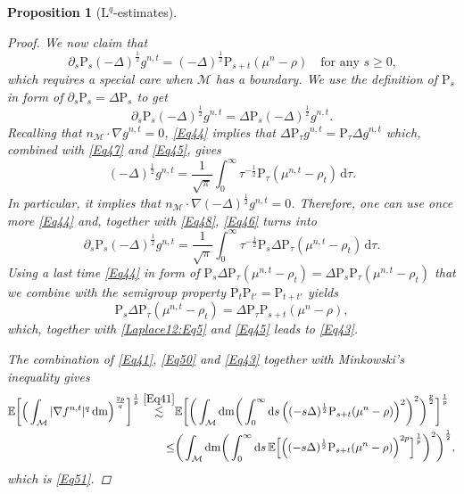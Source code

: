 \documentclass[11pt,a4paper,oneside]{amsart}
\numberwithin{equation}{section}
\newtheorem{proposition}[theorem]{Proposition}
\newcommand{\dd}{\mathrm{d}}
\newcommand{\LL}{\mathrm{L}}
\newcommand{\m}{\mathrm{m}}
\begin{document}
\begin{proposition}[$\LL^{q}$-estimates]
\begin{proof}
%
We now claim that
%
\begin{equation}\label{Eq43}
\partial_s\text{P}_s(-\Delta)^{\frac{1}{2}}g^{n,t}=(-\Delta)^{\frac{1}{2}}\text{P}_{s+t}(\mu^n-\rho)\quad\text{for any $s\geq 0$,}
\end{equation}
%
which requires a special care when $\mathcal{M}$ has a boundary. We use the definition of $\text{P}_s$ in form of $\partial_s\text{P}_s=\Delta\text{P}_s$  to get
%
\begin{equation}\label{Eq46}
\partial_s\text{P}_s(-\Delta)^{\frac{1}{2}}g^{n,t}=\Delta\text{P}_s(-\Delta)^{\frac{1}{2}}g^{n,t}.
\end{equation}
% 
Recalling that $n_{\mathcal{M}}\cdot \nabla g^{n,t}=0$, \eqref{Eq44} implies that $\Delta\text{P}_{\tau}g^{n,t}=\text{P}_{\tau}\Delta g^{n,t}$ which, combined with \eqref{Eq47} and \eqref{Eq45}, gives
%
\begin{equation}\label{Eq48}
(-\Delta)^{\frac{1}{2}} g^{n,t}=\frac{1}{\sqrt{\pi}}\int_{0}^\infty \tau^{-\frac{1}{2}}\text{P}_{\tau}(\mu^{n,t}-\rho_t)\,\dd\tau.
\end{equation}
%
In particular, it implies that $n_{\mathcal{M}}\cdot \nabla(-\Delta)^{\frac{1}{2}}g^{n,t}=0$. Therefore, one can use once more \eqref{Eq44} and, together with \eqref{Eq48}, \eqref{Eq46} turns into
%
\begin{equation}\label{Laplace12:Eq5}
%
\partial_s\text{P}_s(-\Delta)^{\frac{1}{2}}g^{n,t}=\frac{1}{\sqrt{\pi}}\int_{0}^\infty\tau^{-\frac{1}{2}}\text{P}_s\Delta\text{P}_{\tau}(\mu^{n,t}-\rho_t)\,\dd\tau.
%
\end{equation}
%
Using a last time \eqref{Eq44} in form of $\text{P}_s\Delta\text{P}_{\tau}(\mu^{n,t}-\rho_t)=\Delta\text{P}_s\text{P}_{\tau}(\mu^{n,t}-\rho_t)$ that we combine with the semigroup property $\text{P}_{t}\text{P}_{t'}=\text{P}_{t+t'}$ yields
%
$$\text{P}_s\Delta\text{P}_{\tau}(\mu^{n,t}-\rho_t)=\Delta\text{P}_{\tau}\text{P}_{s+t}(\mu^{n}-\rho),$$
%
which, together with \eqref{Laplace12:Eq5} and \eqref{Eq45} leads to \eqref{Eq43}.

%
\medskip
%

The combination of \eqref{Eq41}, \eqref{Eq50} and \eqref{Eq43} together with Minkowski's inequality gives
%
\begin{equation*}
\begin{aligned}
%
\mathbb{E}\bigg[\Big(\int_{\mathcal{M}}\vert \nabla f^{n,t}\vert^q\,\dd\m\Big)^{\frac{2p}{q}}\bigg]^{\frac{1}{p}}\stackrel{\eqref{Eq41}}{\lesssim}&\mathbb{E}\bigg[\bigg(\int_{\mathcal{M}}\dd\m\bigg(\int_{0}^{\infty}\dd s\,\Big((-s\Delta)^{\frac{1}{2}}\text{P}_{s+t}(\mu^n-\rho)\Big)^2\bigg)^2\bigg)^{\frac{p}{2}}\bigg]^{\frac{1}{p}}\\
\leq& \bigg(\int_{\mathcal{M}}\dd\m\bigg(\int_{0}^{\infty}\dd s\,\mathbb{E}\Big[\Big((-s\Delta)^{\frac{1}{2}}\text{P}_{s+t}(\mu^n-\rho)\Big)^{2p}\Big]^{\frac{1}{p}}\bigg)^2\bigg)^{\frac{1}{2}},
%
\end{aligned}
\end{equation*}
%
which is \eqref{Eq51}.


\end{proof}
\end{proposition}
\end{document}

